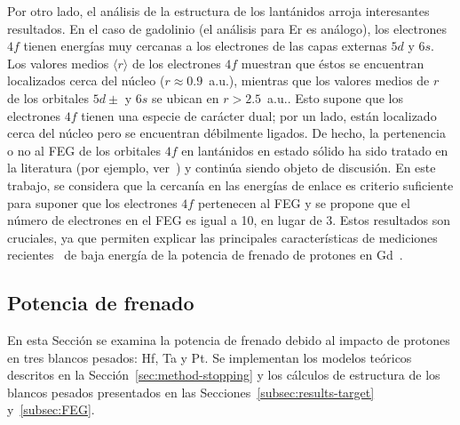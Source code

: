 Por otro lado, el análisis de la estructura de los lantánidos arroja 
interesantes resultados. En el caso de gadolinio (el análisis para Er es 
análogo), los electrones $4f$ tienen energías muy cercanas a los 
electrones de las capas externas $5d$ y $6s$. Los valores medios 
$\langle r\rangle$ de los electrones $4f$ muestran que éstos se 
encuentran localizados cerca del núcleo ($r\approx 0.9$~a.u.), mientras 
que los valores medios de $r$ de los orbitales $5d\pm$ y $6s$ se ubican 
en $r>2.5$~a.u.. Esto supone que los electrones $4f$ tienen una especie 
de carácter dual; por un lado, están localizado cerca del núcleo pero se 
encuentran débilmente ligados. De hecho, la pertenencia o no al FEG de 
los orbitales $4f$ en lantánidos en estado sólido ha sido tratado en la 
literatura (por ejemplo, ver~\cite{Strange:99,Bonnelle:15}) y continúa 
siendo objeto de discusión. En este trabajo, se considera que la 
cercanía en las energías de enlace es criterio suficiente para suponer 
que los electrones $4f$ pertenecen al FEG y se propone que el número de 
electrones en el FEG es igual a 10, en lugar de 3. Estos resultados son 
cruciales, ya que permiten explicar las principales características de 
mediciones recientes~\cite{Montanari:17} de baja energía de la potencia 
de frenado de protones en Gd~\cite{Roth:17}. 

\begin{comment}
Bonelle & Spector: 
The discrete or extended character of 4f levels in the rare-earth metals 
and compounds remained, therefore, an open problem and the question was 
to know whether to treat the 4f levels in a core-like model or in a 
strongly correlated band model. 
\end{comment}

\subsection{Potencia de frenado}
\label{subsec:results-stopping}

En esta Sección se examina la potencia de frenado debido al impacto de 
protones en tres blancos pesados: Hf, Ta y Pt. Se implementan los 
modelos teóricos descritos en la Sección~\ref{sec:method-stopping} y los
cálculos de estructura de los blancos pesados presentados en las 
Secciones~\ref{subsec:results-target} y~\ref{subsec:FEG}.

